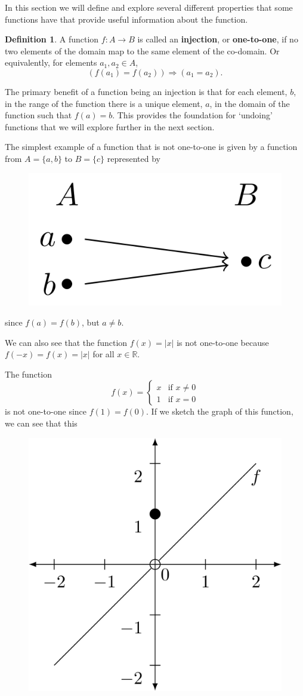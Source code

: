 \documentclass[
]{book}
\theoremstyle{definition}
\newtheorem{definition}{Definition}[chapter]
\theoremstyle{definition}
\theoremstyle{definition}
\theoremstyle{definition}
\theoremstyle{remark}
\begin{document}
In this section we will define and explore several different properties that some functions have that provide useful information about the function.

\begin{definition}
A function \(f:A\rightarrow B\) is called an \textbf{injection}, or \textbf{one-to-one}, if no two elements of the domain map to the same element of the co-domain. Or equivalently, for elements \(a_1,a_2 \in A\), \[\left(f(a_1)=f(a_2)\right) \Rightarrow \left(a_1=a_2\right).\]
\end{definition}

The primary benefit of a function being an injection is that for each element, \(b\), in the range of the function there is a unique element, \(a\), in the domain of the function such that \(f(a)=b\). This provides the foundation for `undoing' functions that we will explore further in the next section.

The simplest example of a function that is not one-to-one is given by a function from \(A=\{a,b\}\) to \(B=\{c\}\) represented by

\begin{figure}

{\centering \includegraphics[width=0.3\linewidth]{tikz/example-noninjection} 

}

\end{figure}

since \(f(a)=f(b)\), but \(a\neq b\).

We can also see that the function \(f(x)=|x|\) is not one-to-one because \(f(-x)=f(x)=|x|\) for all \(x\in \mathbb{R}\).

The function
\[f(x)=\begin{cases} x & \mbox{if } x\neq 0 \\
1 & \mbox{if } x=0
\end{cases}\]
is not one-to-one since \(f(1)=f(0)\). If we sketch the graph of this function, we can see that this

\begin{figure}

{\centering \includegraphics[width=0.3\linewidth]{tikz/example2-noninjection} 

}

\end{figure}
\end{document}
